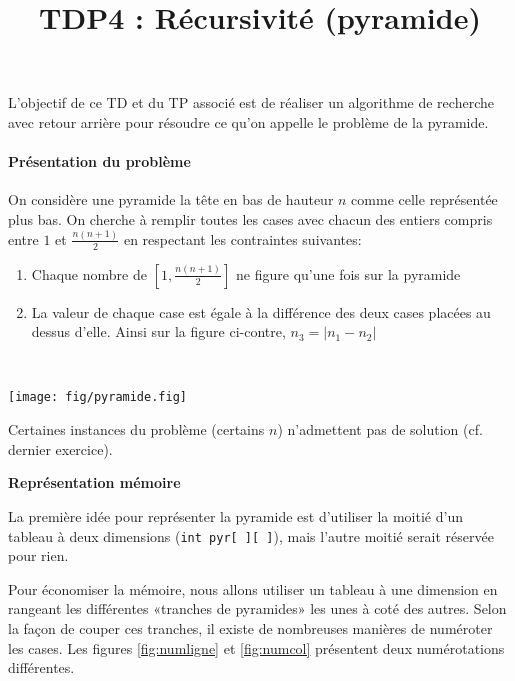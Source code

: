 \documentclass[10pt]{article}\usepackage[correction,nu]{esial}
\begin{document}
\color{black}
\title{TDP4 : Récursivité (pyramide)}
\maketitle

L'objectif de ce TD et du TP associé est de réaliser un algorithme de
recherche avec retour arrière pour résoudre ce qu'on appelle le problème de
la pyramide.

\paragraph{Présentation du problème}

On considère une pyramide la tête en bas de hauteur $n$ comme celle
représentée plus bas. On cherche à remplir toutes les cases avec chacun des
entiers compris entre $1$ et $\frac{n(n+1)}{2}$ en respectant les contraintes
suivantes:

\begin{minipage}{.8\linewidth}
\begin{enumerate}
\item Chaque nombre de $\left[1,\frac{n(n+1)}{2}\right]$ ne figure qu'une fois sur la pyramide
\item La valeur de chaque case est égale à la différence des deux cases placées
  au dessus d'elle.
  Ainsi sur la figure ci-contre, $n_3=|n_1 - n_2|$
\end{enumerate}  
\end{minipage}~\begin{minipage}{.2\linewidth}
  \centering
  \texttt{[image: fig/pyramide.fig]} %
\end{minipage}


\noindent Certaines instances du problème (certains $n$) n'admettent pas de
solution (cf. dernier exercice).

\begin{Exercice}\textbf{Représentation mémoire}

  \noindent La première idée pour représenter la pyramide est d'utiliser la
  moitié d'un tableau à deux dimensions (\texttt{int pyr[ ][ ]}), mais l'autre
  moitié serait réservée pour rien.

  Pour économiser la mémoire, nous allons utiliser un tableau à une dimension
  en rangeant les différentes «tranches de pyramides» les unes à coté des
  autres. Selon la façon de couper ces tranches, il existe de nombreuses
  manières de numéroter les cases. Les figures \ref{fig:numligne} et
  \ref{fig:numcol} présentent deux numérotations différentes.
\end{Exercice}
\end{document}
